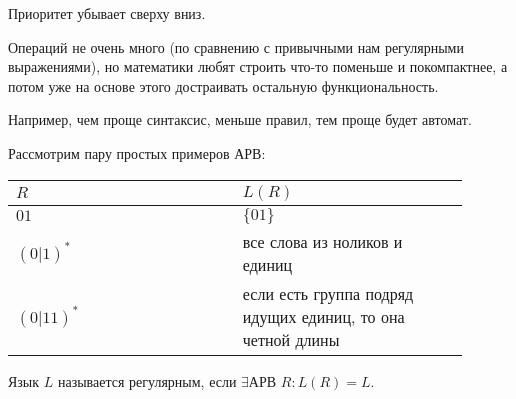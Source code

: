 Приоритет убывает сверху вниз.

\begin{Rem}
Операций не очень много (по сравнению с привычными нам регулярными выражениями), но математики любят строить что-то поменьше и покомпактнее, а потом уже на основе этого достраивать остальную функциональность.

Например, чем проще синтаксис, меньше правил, тем проще будет автомат.
\end{Rem}

\begin{exmp}
Рассмотрим пару простых примеров АРВ:

\begin{tabular}{p{0.45\linewidth} | p{0.45\linewidth}}
$R$ & $L(R)$ \\
\hline
$01$ & $\{01\}$ \\
$(0|1)^*$ & все слова из ноликов и единиц \\
$(0|11)^*$ & если есть группа подряд идущих единиц, то она четной длины
\end{tabular}
\end{exmp}

\begin{Def}
Язык $L$ называется регулярным, если $\exists \text{АРВ } R: L(R) = L$.
\end{Def}
